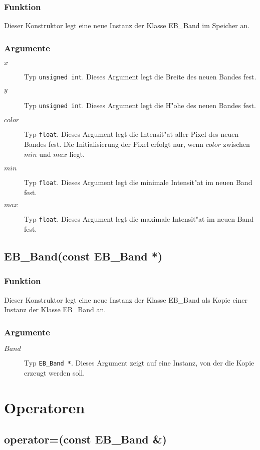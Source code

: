 \documentclass[12pt,a4paper,draft,twoside,onecolumn,titlepage]{book}
\newcommand{\carg}[1]{$ #1 $}
\newcommand{\ctyp}[1]{{\tt #1}}
\newcommand{\class}[1]{{\sc #1}}
\newcommand{\arglist}[1]{\footnotesize{#1}}
\begin{document}
\subsubsection{Funktion}
Dieser Konstruktor legt eine neue Instanz der Klasse \class{EB\_Band} im Speicher an.
\subsubsection{Argumente}
\begin{description}
\item[\carg{x}]{Typ \ctyp{unsigned int}. Dieses Argument legt die Breite des neuen Bandes fest.}
\item[\carg{y}]{Typ \ctyp{unsigned int}. Dieses Argument legt die H"ohe des neuen Bandes fest.}
\item[\carg{color}]{Typ \ctyp{float}. Dieses Argument legt die Intensit"at aller Pixel des neuen Bandes fest. Die Initialisierung der Pixel erfolgt nur, wenn \carg{color} zwischen \carg{min} und \carg{max} liegt.}
\item[\carg{min}]{Typ \ctyp{float}. Dieses Argument legt die minimale Intensit"at im neuen Band fest.}
\item[\carg{max}]{Typ \ctyp{float}. Dieses Argument legt die maximale Intensit"at im neuen Band fest.}
\end{description}
\subsection{EB\_Band\arglist{(const EB\_Band *)}}
\subsubsection{Funktion}
Dieser Konstruktor legt eine neue Instanz der Klasse \class{EB\_Band} als Kopie einer Instanz der Klasse \class{EB\_Band} an.
\subsubsection{Argumente}
\begin{description}
\item[\carg{Band}]{Typ \ctyp{EB\_Band *}. Dieses Argument zeigt auf eine Instanz, von der die Kopie erzeugt werden soll.}
\end{description}
\section{Operatoren}
\subsection{operator=\arglist{(const EB\_Band \&)}}
\end{document}
